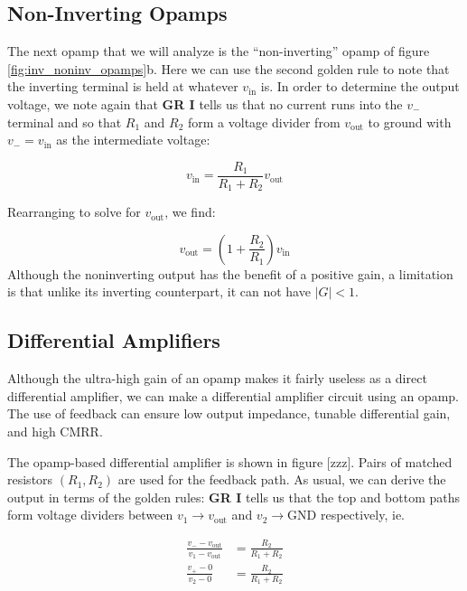 \documentclass{tufte-book}
\begin{document}
\subsection{Non-Inverting Opamps}
The next opamp that we will analyze is the ``non-inverting'' opamp of figure \ref{fig:inv_noninv_opamps}b. Here we can use the second golden rule to note that the inverting terminal is held at whatever $v_\text{in}$ is. In order to determine the output voltage, we note again that \textbf{GR I} tells us that no current runs into the $v_-$ terminal and so that $R_1$ and $R_2$ form a voltage divider from $v_\text{out}$ to ground with $v_- = v_\text{in}$ as the intermediate voltage:

\begin{equation}
\label{eq:noninverting_opamp_deriv_1}
v_\text{in} = \frac{R_1}{R_1 + R_2}v_\text{out}
\end{equation}

Rearranging to solve for $v_\text{out}$, we find: 

\begin{equation}
\label{eq:noninverting_opamp}
v_\text{out} = \left(1+\frac{R_2}{R_1}\right)v_\text{in}
\end{equation}
Although the noninverting output has the benefit of a positive gain, a limitation is that unlike its inverting counterpart, it can not have $\vert G\vert < 1$.

\subsection{Differential Amplifiers}
Although the ultra-high gain of an opamp makes it fairly useless as a direct differential amplifier, we can make a differential amplifier circuit using an opamp. The use of feedback can ensure low output impedance, tunable differential gain, and high CMRR.

The opamp-based differential amplifier is shown in figure [zzz]. Pairs of matched resistors $\left(R_1,R_2\right)$ are used for the feedback path. As usual, we can derive the output in terms of the golden rules: \textbf{GR I} tells us that the top and bottom paths form voltage dividers between $v_1\rightarrow v_\text{out}$ and $v_2\rightarrow \text{GND}$ respectively, ie.

\begin{align*}
\frac{v_--v_\text{out}}{v_1-v_\text{out}} &= \frac{R_2}{R_1+R_2} \\
\frac{v_+-0}{v_2-0} &= \frac{R_2}{R_1+R_2} 
\end{align*}
\end{document}
